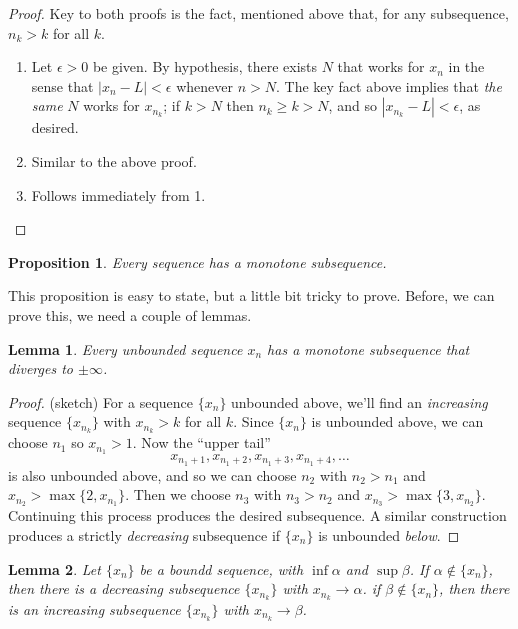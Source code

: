 \documentclass[12pt]{scrbook}
\newtheorem{lemma}{Lemma}[section]
\newtheorem{proposition}{Proposition}[section]
\begin{document}
\begin{proof}
Key to both proofs is the fact, mentioned above that, for any subsequence, $n_k > k$ for all $k$.  
\begin{enumerate}
\item
Let $\epsilon > 0$  be given.  By hypothesis, there exists $N$ that works for $x_n$ in the sense that $|x_n - L| < \epsilon$
whenever $ n > N $. The key fact above implies that {\em the same} $N$ works for $x_{n_k}$; if $k > N$ then
$n_k \ge k > N$, and so $|x_{n_k} - L| < \epsilon$, as desired.

\item Similar to the above proof.

\item Follows immediately from 1.

\end{enumerate}
\end{proof}

\begin{proposition}
\label{prop-monotone-subsequence}
Every sequence has a monotone subsequence.
\end{proposition}

This proposition is easy to state, but a little bit tricky to prove. Before, we can prove this, we need a couple of lemmas.

\begin{lemma}
\label{lemma-monotone-subsequence-1}
Every unbounded sequence $x_n$ has a monotone subsequence that diverges to $\pm \infty$.
\end{lemma}
\begin{proof} (sketch)
For a sequence $\{x_n\}$ unbounded above, we'll find an {\em increasing} sequence $\{x_{n_k}\}$ with $x_{n_k} > k$
for all $k$. Since $\{x_n\}$ is unbounded above, we can choose $n_1$ so $x_{n_1} > 1$.  Now the ``upper tail''
\[ x_{{n_1} + 1},  x_{{n_1} + 2}, x_{{n_1} + 3}, x_{{n_1} + 4}, \ldots \]
is also unbounded above, and so we can choose $n_2$ with $n_2 > n_1$ and $x_{n_2} > \max\{2, x_{n_1} \}$.
Then we choose $n_3$ with $n_3 > n_2$ and $x_{n_3} > \max\{3, x_{n_2} \}$.  Continuing this process produces the desired subsequence.  A similar construction produces a strictly {\em decreasing} subsequence if $\{x_n\}$ is unbounded {\em below}.
\end{proof}

\begin{lemma}
\label{lemma-monotone-subsequence-2}
Let $\{x_n\}$ be a boundd sequence, with $\inf \alpha$ and $\sup \beta$. If $\alpha \notin \{x_n\}$, then there is a decreasing subsequence $\{x_{n_k}\}$ with $x_{n_k} \rightarrow \alpha$.  if $\beta \notin \{x_n\}$, then there is an increasing subsequence
$\{x_{n_k}\}$ with $x_{n_k} \rightarrow \beta$.
\end{lemma}
\end{document}
